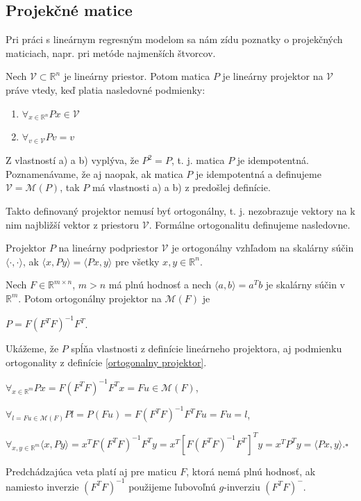 \subsection{Projekčné matice}

Pri práci s lineárnym regresným modelom sa nám zídu poznatky o projekčných maticiach, napr. pri metóde najmenších štvorcov.

\begin{defin}
\label{linearny projektor}
Nech $\mathcal{V} \subset \mathbb{R}^n$ je lineárny priestor. Potom matica $P$ je lineárny projektor na $\mathcal{V}$ práve vtedy,
keď platia nasledovné podmienky:
\begin{enumerate}[label=\emph{\alph*})]
  \item
    $
    {\forall}_{x \in \mathbb{R}^n} Px \in \mathcal{V}
    $
  \item
    $
    {\forall}_{v \in \mathcal{V}} Pv = v
    $
\end{enumerate}
\end{defin}

Z vlastností a) a b) vyplýva, že $P^2 = P$, t. j. matica $P$ je idempotentná.
Poznamenávame, že aj naopak, ak matica $P$ je idempotentná a definujeme $\mathcal{V} = \mathcal{M}(P)$, tak $P$ má vlastnosti a) a b) z predošlej definície.

Takto definovaný projektor nemusí byť ortogonálny, t. j. nezobrazuje vektory na k nim najbližší vektor z priestoru $\mathcal{V}$.
Formálne ortogonalitu definujeme nasledovne.

\begin{defin}
\label{ortogonalny projektor}
Projektor $P$ na lineárny podpriestor $\mathcal{V}$ je ortogonálny vzhľadom na skalárny súčin $\langle \cdot,\cdot \rangle$,
ak $\langle x, Py \rangle = \langle Px, y \rangle$ pre všetky $x, y \in \mathbb{R}^n$.
\end{defin}

\begin{theorem}
Nech $F \in \mathbb{R}^{m \times n}$, $m > n$ má plnú hodnosť a nech $\langle a, b \rangle = a^T b$ je skalárny súčin v $\mathbb{R}^m$.
Potom ortogonálny projektor na $\mathcal{M}(F)$ je
\begin{center}
$
P = F(F^T F)^{-1} F^T
$.
\end{center}
\end{theorem}

\begin{dokaz}
Ukážeme, že $P$ spĺňa vlastnosti z definície lineárneho projektora, aj podmienku ortogonality z definície \ref{ortogonalny projektor}.
\begin{center}
$
{\forall}_{x \in \mathbb{R}^m} Px = F(F^T F)^{-1} F^T x = Fu \in \mathcal{M}(F)
$,
\end{center}
\begin{center}
$
{\forall}_{l = Fu \in \mathcal{M}(F)} Pl = P(Fu) = F(F^T F)^{-1} F^T F u = Fu = l
$,
\end{center}
\begin{center}
$
{\forall}_{x, y \in \mathbb{R}^m} \langle x, Py \rangle = x^T F(F^T F)^{-1} F^T y = x^T [F (F^T F)^{-1} F^T]^T y = x^T P^T y = \langle Px, y \rangle
$.$\square$
\end{center}
\end{dokaz}

\begin{theorem}
\label{ortogonalny projektor na maticu}
Predchádzajúca veta platí aj pre maticu $F$, ktorá nemá plnú hodnosť,
ak namiesto inverzie $(F^T F)^{-1}$ použijeme ľubovoľnú $g$-inverziu $(F^T F)^{-}$.
\end{theorem}